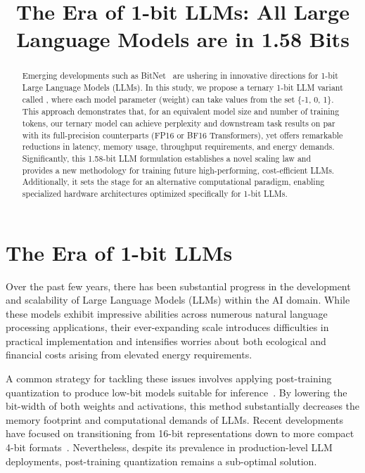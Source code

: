 \title{The Era of 1-bit LLMs: All Large Language Models are in 1.58 Bits}

\begin{abstract}
Emerging developments such as BitNet~\cite{bitnet} are ushering in innovative directions for 1-bit Large Language Models (LLMs). In this study, we propose a ternary 1-bit LLM variant called \textbf{}, where each model parameter (weight) can take values from the set \{-1, 0, 1\}. This approach demonstrates that, for an equivalent model size and number of training tokens, our ternary model can achieve perplexity and downstream task results on par with its full-precision counterparts (FP16 or BF16 Transformers), yet offers remarkable reductions in latency, memory usage, throughput requirements, and energy demands. Significantly, this 1.58-bit LLM formulation establishes a novel scaling law and provides a new methodology for training future high-performing, cost-efficient LLMs. Additionally, it sets the stage for an alternative computational paradigm, enabling specialized hardware architectures optimized specifically for 1-bit LLMs.
\end{abstract}

\section{The Era of 1-bit LLMs}

Over the past few years, there has been substantial progress in the development and scalability of Large Language Models (LLMs) within the AI domain. While these models exhibit impressive abilities across numerous natural language processing applications, their ever-expanding scale introduces difficulties in practical implementation and intensifies worries about both ecological and financial costs arising from elevated energy requirements.

A common strategy for tackling these issues involves applying post-training quantization to produce low-bit models suitable for inference~\cite{smoothquant, gptq, quip, quip_sharp}. By lowering the bit-width of both weights and activations, this method substantially decreases the memory footprint and computational demands of LLMs. Recent developments have focused on transitioning from 16-bit representations down to more compact 4-bit formats~\cite{gptq, awq}. Nevertheless, despite its prevalence in production-level LLM deployments, post-training quantization remains a sub-optimal solution.

